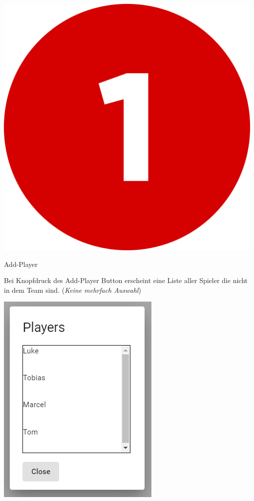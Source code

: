 \bigskip
\includegraphics[scale=0.05]{pics/user-guide/numbers/number-1.png} \begin{LARGE} Add-Player \end{LARGE}

Bei Knopfdruck des Add-Player Button erscheint eine Liste aller Spieler die nicht in dem Team sind.
(\textit{Keine mehrfach Auswahl}) 

\includegraphics[scale=0.5]{pics/user-guide/add-player.PNG}

